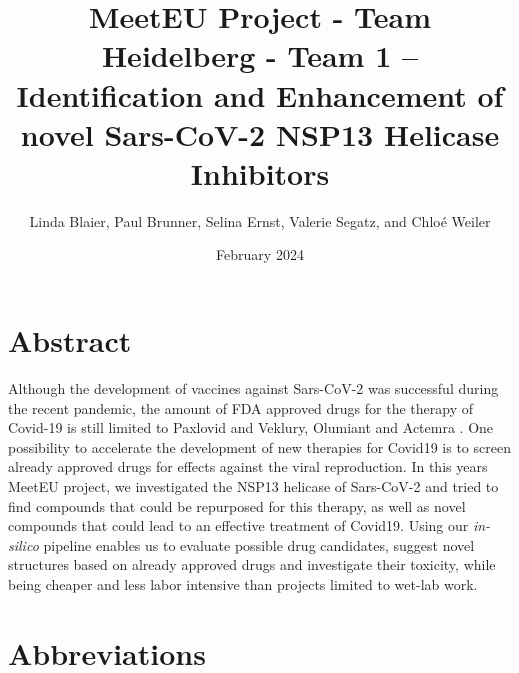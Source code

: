 \documentclass[11pt, letterpaper, titlepage]{article}
\title{MeetEU Project - Team Heidelberg - Team 1 -- \\ Identification and Enhancement of novel Sars-CoV-2 NSP13 Helicase Inhibitors}
\author{Linda Blaier, Paul Brunner, Selina Ernst, Valerie Segatz, and Chlo\'{e} Weiler}
\date{February 2024}
\renewcommand{\cite}{\parencite}
\begin{document}
\maketitle

\ihead{\headmark}
\cfoot{\pagemark}   %

\section{Abstract}
Although the development of vaccines against Sars-CoV-2 was successful during the recent pandemic, the amount of FDA approved drugs for the therapy of Covid-19 is still limited to Paxlovid and Veklury, Olumiant and Actemra \cite{FDACOVID}. One possibility to accelerate the development of new therapies for Covid19 is to screen already approved drugs for effects against the viral reproduction. In this years MeetEU project, we investigated the NSP13 helicase of Sars-CoV-2 and tried to find compounds that could be repurposed for this therapy, as well as novel compounds that could lead to an effective treatment of Covid19. Using our \textit{in-silico} pipeline enables us to evaluate possible drug candidates, suggest novel structures based on already approved drugs and investigate their toxicity, while being cheaper and less labor intensive than projects limited to wet-lab work. 
\FloatBarrier

\newpage
{\setlength{\parskip}{0.2cm}
\section*{Abbreviations}
    \begin{acronym}[LC-MS/MS23]
       
        
        
        
        
    \end{acronym}
}
\newpage
\end{document}
